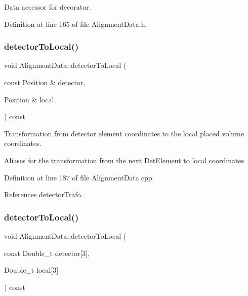 Data accessor for decorator. 



Definition at line 165 of file Alignment\+Data.\+h.

\hypertarget{class_d_d4hep_1_1_alignments_1_1_alignment_data_ae82379c6de7ca0295a39a876303377b5}{}\label{class_d_d4hep_1_1_alignments_1_1_alignment_data_ae82379c6de7ca0295a39a876303377b5} 
\subsubsection{\texorpdfstring{detector\+To\+Local()}{detectorToLocal()}\hspace{0.1cm}{\footnotesize\ttfamily [1/4]}}
{\footnotesize\ttfamily void Alignment\+Data\+::detector\+To\+Local (\begin{DoxyParamCaption}\item[{const Position \&}]{detector,  }\item[{Position \&}]{local }\end{DoxyParamCaption}) const}



Transformation from detector element coordinates to the local placed volume coordinates. 

Aliases for the transformation from the next Det\+Element to local coordinates 

Definition at line 187 of file Alignment\+Data.\+cpp.



References detector\+Trafo.

\hypertarget{class_d_d4hep_1_1_alignments_1_1_alignment_data_a3cd2f3d20d1a277a1145a3257f2badf1}{}\label{class_d_d4hep_1_1_alignments_1_1_alignment_data_a3cd2f3d20d1a277a1145a3257f2badf1} 
\subsubsection{\texorpdfstring{detector\+To\+Local()}{detectorToLocal()}\hspace{0.1cm}{\footnotesize\ttfamily [2/4]}}
{\footnotesize\ttfamily void Alignment\+Data\+::detector\+To\+Local (\begin{DoxyParamCaption}\item[{const Double\+\_\+t}]{detector\mbox{[}3\mbox{]},  }\item[{Double\+\_\+t}]{local\mbox{[}3\mbox{]} }\end{DoxyParamCaption}) const}



